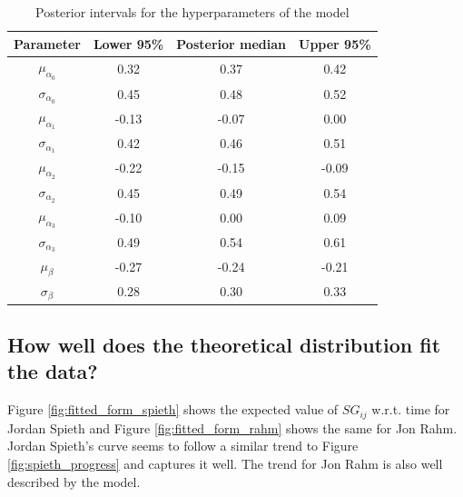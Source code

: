 \documentclass{article}\usepackage[]{graphicx}\usepackage[]{color}
\begin{document}
\begin{table}[!h]

\caption{\label{tab:unnamed-chunk-1}Posterior intervals for the hyperparameters of the model}
\centering
\begin{tabular}[t]{cccc}
\toprule
\textbf{Parameter} & \textbf{Lower 95\%} & \textbf{Posterior median} & \textbf{Upper 95\%}\\
\midrule
$\mu_{\alpha_0}$ & 0.32 & 0.37 & 0.42\\
$\sigma_{\alpha_0}$ & 0.45 & 0.48 & 0.52\\
\addlinespace
$\mu_{\alpha_1}$ & -0.13 & -0.07 & 0.00\\
$\sigma_{\alpha_1}$ & 0.42 & 0.46 & 0.51\\
\addlinespace
$\mu_{\alpha_2}$ & -0.22 & -0.15 & -0.09\\
$\sigma_{\alpha_2}$ & 0.45 & 0.49 & 0.54\\
\addlinespace
$\mu_{\alpha_3}$ & -0.10 & 0.00 & 0.09\\
$\sigma_{\alpha_3}$ & 0.49 & 0.54 & 0.61\\
\addlinespace
$\mu_{\beta}$ & -0.27 & -0.24 & -0.21\\
$\sigma_{\beta}$ & 0.28 & 0.30 & 0.33\\
\bottomrule
\end{tabular}
\end{table}


\newpage
\subsection{How well does the theoretical distribution fit the data?}
Figure \ref{fig:fitted_form_spieth} shows the expected value of $SG_{ij}$ w.r.t. time for Jordan Spieth and Figure \ref{fig:fitted_form_rahm} shows the same for Jon Rahm. Jordan Spieth's curve seems to follow a similar trend to Figure \ref{fig:spieth_progress} and captures it well. The trend for Jon Rahm is also well described by the model. 
\end{document}
